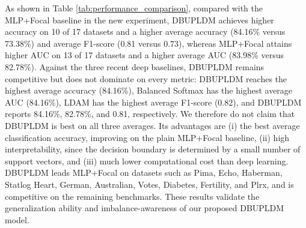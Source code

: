 \documentclass[a4paper]{cas-sc}
\begin{document}
{\color{red}As shown in Table \ref{tab:performance_comparison}, compared with the MLP+Focal baseline in the new experiment, DBUPLDM achieves higher accuracy on 10 of 17 datasets and a higher average accuracy (84.16\% versus 73.38\%) and average F1-score (0.81 versus 0.73), whereas MLP+Focal attains higher AUC on 13 of 17 datasets and a higher average AUC (83.98\% versus 82.78\%). Against the three recent deep baselines, DBUPLDM remains competitive but does not dominate on every metric: DBUPLDM reaches the highest average accuracy (84.16\%), Balanced Softmax has the highest average AUC (84.16\%), LDAM has the highest average F1-score (0.82), and DBUPLDM reports 84.16\%, 82.78\%, and 0.81, respectively. We therefore do not claim that DBUPLDM is best on all three averages. Its advantages are (i) the best average classification accuracy, improving on the plain MLP+Focal baseline, (ii) high interpretability, since the decision boundary is determined by a small number of support vectors, and (iii) much lower computational cost than deep learning. DBUPLDM leads MLP+Focal on datasets such as Pima, Echo, Haberman, Statlog Heart, German, Australian, Votes, Diabetes, Fertility, and Plrx, and is competitive on the remaining benchmarks. These results validate the generalization ability and imbalance-awareness of our proposed DBUPLDM model.}
\end{document}
